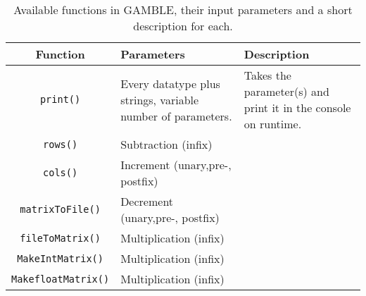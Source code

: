 \begin{table}[h]
    \centering
    \begin{tabular}{|c|p{6cm}|p{7cm}|}
    \hline
    \textbf{Function}  & \textbf{Parameters}                                & \textbf{Description}            \\ \hline
    \texttt{print()}            & Every datatype plus strings, variable number of parameters. & Takes the parameter(s) and print it in the console on runtime.                     \\ \hline 
    \texttt{rows()}    & Subtraction (infix)            &         \\ \hline 
    \texttt{cols()}             & Increment (unary,pre-, postfix)&       \\ \hline    
    \texttt{matrixToFile()}     & Decrement (unary,pre-, postfix)&       \\ \hline
    \texttt{fileToMatrix()}     & Multiplication (infix)         &       \\ \hline
    \texttt{MakeIntMatrix()}    & Multiplication (infix)         &       \\ \hline
    \texttt{MakefloatMatrix()}  & Multiplication (infix)         &       \\ \hline
    \end{tabular}
    \caption{Available functions in GAMBLE, their input parameters and a short description for each.}\label{tbl:funcs}
\end{table}
